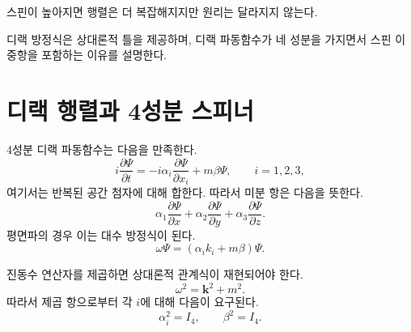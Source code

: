 스핀이 높아지면 행렬은 더 복잡해지지만 원리는 달라지지 않는다.

\begin{classroomqa}
\end{classroomqa}

\begin{classroomqa}
\end{classroomqa}

디랙 방정식은 상대론적 틀을 제공하며, 디랙 파동함수가 네 성분을 가지면서 스핀 이중항을 포함하는 이유를 설명한다.

\section{디랙 행렬과 4성분 스피너}

4성분 디랙 파동함수는 다음을 만족한다.
\begin{equation}
i\frac{\partial\Psi}{\partial t}
=
-i\alpha_i\frac{\partial\Psi}{\partial x_i}
+m\beta\Psi,
\qquad i=1,2,3,
\end{equation}
여기서는 반복된 공간 첨자에 대해 합한다. 따라서 미분 항은 다음을 뜻한다.
\begin{equation}
\alpha_1\frac{\partial\Psi}{\partial x}
+\alpha_2\frac{\partial\Psi}{\partial y}
+\alpha_3\frac{\partial\Psi}{\partial z}.
\end{equation}
평면파의 경우 이는 대수 방정식이 된다.
\begin{equation}
\omega\Psi=(\alpha_i k_i+m\beta)\Psi.
\end{equation}

\begin{classroomqa}
\end{classroomqa}

진동수 연산자를 제곱하면 상대론적 관계식이 재현되어야 한다.
\begin{equation}
\omega^2=\mathbf{k}^2+m^2.
\end{equation}
따라서 제곱 항으로부터 각 \(i\)에 대해 다음이 요구된다.
\begin{equation}
\alpha_i^2=I_4,
\qquad
\beta^2=I_4.
\end{equation}

